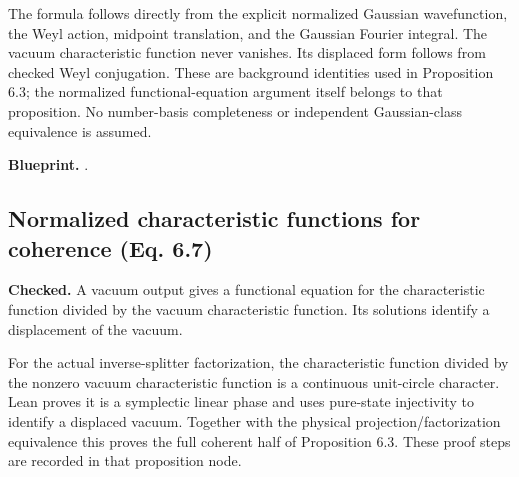 The formula follows directly from the explicit normalized Gaussian wavefunction, the Weyl action, midpoint translation, and the Gaussian Fourier integral. The vacuum characteristic function never vanishes. Its displaced form follows from checked Weyl conjugation. These are background identities used in Proposition 6.3; the normalized functional-equation argument itself belongs to that proposition. No number-basis completeness or independent Gaussian-class equivalence is assumed.


\textbf{Blueprint.} .

\subsection{Normalized characteristic functions for coherence (Eq. 6.7)}\label{paper:normalized-chi}
\textbf{Checked.} A vacuum output gives a functional equation for the characteristic function divided by the vacuum characteristic function. Its solutions identify a displacement of the vacuum. 

For the actual inverse-splitter factorization, the characteristic function divided by the nonzero vacuum characteristic function is a continuous unit-circle character. Lean proves it is a symplectic linear phase and uses pure-state injectivity to identify a displaced vacuum. Together with the physical projection/factorization equivalence this proves the full coherent half of Proposition 6.3. These proof steps are recorded in that proposition node.


